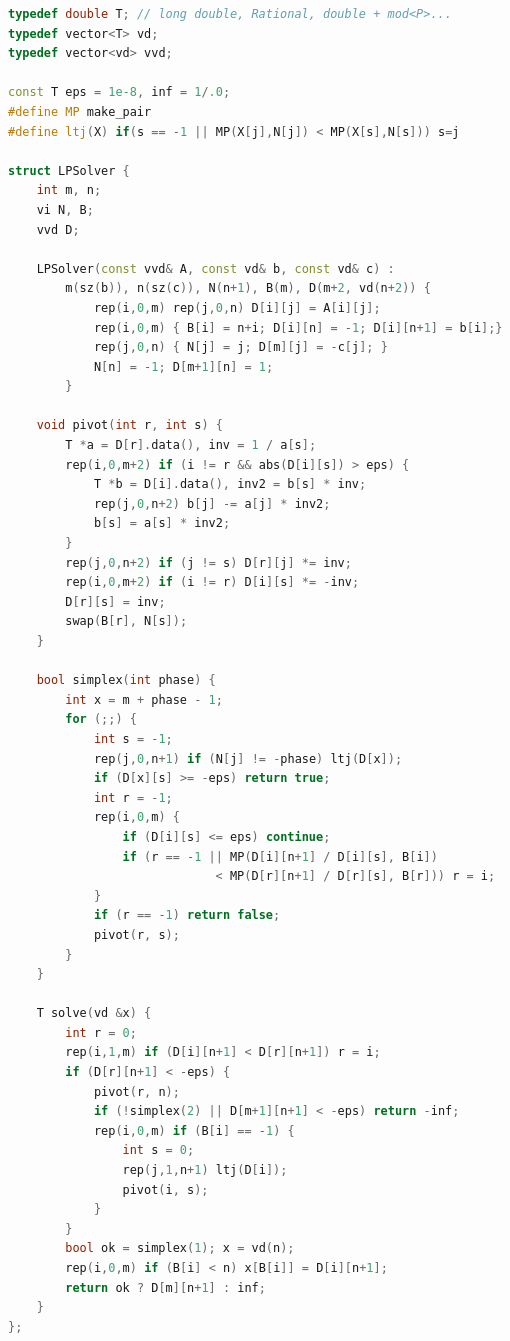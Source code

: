 \begin{multicols}{\Columns}
\begin{lstlisting}[language=C++]
typedef double T; // long double, Rational, double + mod<P>...
typedef vector<T> vd;
typedef vector<vd> vvd;

const T eps = 1e-8, inf = 1/.0;
#define MP make_pair
#define ltj(X) if(s == -1 || MP(X[j],N[j]) < MP(X[s],N[s])) s=j

struct LPSolver {
	int m, n;
	vi N, B;
	vvd D;

	LPSolver(const vvd& A, const vd& b, const vd& c) :
		m(sz(b)), n(sz(c)), N(n+1), B(m), D(m+2, vd(n+2)) {
			rep(i,0,m) rep(j,0,n) D[i][j] = A[i][j];
			rep(i,0,m) { B[i] = n+i; D[i][n] = -1; D[i][n+1] = b[i];}
			rep(j,0,n) { N[j] = j; D[m][j] = -c[j]; }
			N[n] = -1; D[m+1][n] = 1;
		}

	void pivot(int r, int s) {
		T *a = D[r].data(), inv = 1 / a[s];
		rep(i,0,m+2) if (i != r && abs(D[i][s]) > eps) {
			T *b = D[i].data(), inv2 = b[s] * inv;
			rep(j,0,n+2) b[j] -= a[j] * inv2;
			b[s] = a[s] * inv2;
		}
		rep(j,0,n+2) if (j != s) D[r][j] *= inv;
		rep(i,0,m+2) if (i != r) D[i][s] *= -inv;
		D[r][s] = inv;
		swap(B[r], N[s]);
	}

	bool simplex(int phase) {
		int x = m + phase - 1;
		for (;;) {
			int s = -1;
			rep(j,0,n+1) if (N[j] != -phase) ltj(D[x]);
			if (D[x][s] >= -eps) return true;
			int r = -1;
			rep(i,0,m) {
				if (D[i][s] <= eps) continue;
				if (r == -1 || MP(D[i][n+1] / D[i][s], B[i])
				             < MP(D[r][n+1] / D[r][s], B[r])) r = i;
			}
			if (r == -1) return false;
			pivot(r, s);
		}
	}

	T solve(vd &x) {
		int r = 0;
		rep(i,1,m) if (D[i][n+1] < D[r][n+1]) r = i;
		if (D[r][n+1] < -eps) {
			pivot(r, n);
			if (!simplex(2) || D[m+1][n+1] < -eps) return -inf;
			rep(i,0,m) if (B[i] == -1) {
				int s = 0;
				rep(j,1,n+1) ltj(D[i]);
				pivot(i, s);
			}
		}
		bool ok = simplex(1); x = vd(n);
		rep(i,0,m) if (B[i] < n) x[B[i]] = D[i][n+1];
		return ok ? D[m][n+1] : inf;
	}
};
\end{lstlisting}



\end{multicols}
